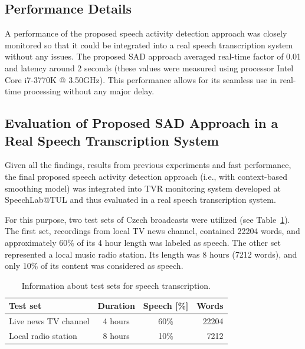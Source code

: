 \documentclass[FM,noheader,EN,bwtitles]{tulthesis}
\begin{document}
\subsection{Performance Details}
\label{ss:SADperformance}
A performance of the proposed speech activity detection approach was closely monitored so that it could be integrated into a real speech transcription system without any issues.
The proposed SAD approach averaged real-time factor of 0.01 and latency around 2 seconds (these values were measured using processor Intel Core i7-3770K @ 3.50GHz).
This performance allows for its seamless use in real-time processing without any major delay. 

\subsection{Evaluation of Proposed SAD Approach in a Real Speech Transcription System}
\label{ss:SADinST}
Given all the findings, results from previous experiments and fast performance, the final proposed speech activity detection approach (i.e., with context-based smoothing model) was integrated into TVR monitoring system developed at SpeechLab@TUL and thus evaluated in a real speech transcription system.

For this purpose, two test sets of Czech broadcasts were utilized (see Table~\ref{table:srData}).
The first set, recordings from local TV news channel, contained 22204 words, and approximately 60\% of its 4 hour length was labeled as speech.
The other set represented a local music radio station.
Its length was 8 hours (7212 words), and only 10\% of its content was considered as speech.

\begin{table}[ht]
\caption{Information about test sets for speech transcription.} 
\label{table:srData}
\centering
\begin{tabular}{lccr}
\hline
Test set & Duration & Speech [\%] & Words\\
\hline
Live news TV channel & 4 hours & 60\% & 22204\\
Local radio station & 8 hours & 10\% & 7212\\
\hline
\end{tabular}
\end{table}
\end{document}
